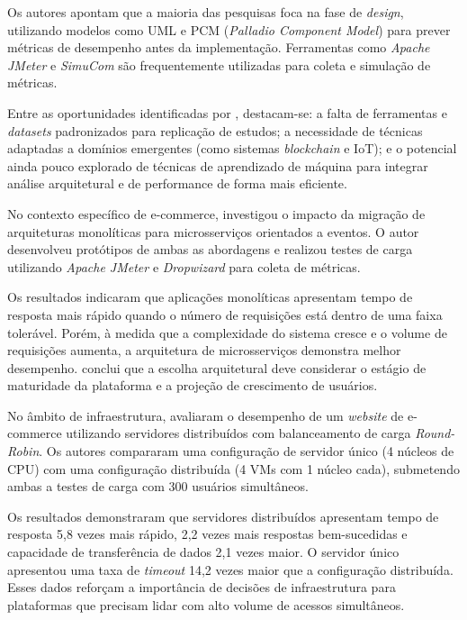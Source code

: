 Os autores apontam que a maioria das pesquisas foca na fase de \textit{design}, utilizando modelos como UML e PCM (\textit{Palladio Component Model}) para prever métricas de desempenho antes da implementação. Ferramentas como \textit{Apache JMeter} e \textit{SimuCom} são frequentemente utilizadas para coleta e simulação de métricas.

Entre as oportunidades identificadas por \cite{zhao_systematic_2024}, destacam-se: a falta de ferramentas e \textit{datasets} padronizados para replicação de estudos; a necessidade de técnicas adaptadas a domínios emergentes (como sistemas \textit{blockchain} e IoT); e o potencial ainda pouco explorado de técnicas de aprendizado de máquina para integrar análise arquitetural e de performance de forma mais eficiente.

No contexto específico de e-commerce, \cite{ubur_reviewing_2023} investigou o impacto da migração de arquiteturas monolíticas para microsserviços orientados a eventos. O autor desenvolveu protótipos de ambas as abordagens e realizou testes de carga utilizando \textit{Apache JMeter} e \textit{Dropwizard} para coleta de métricas.

Os resultados indicaram que aplicações monolíticas apresentam tempo de resposta mais rápido quando o número de requisições está dentro de uma faixa tolerável. Porém, à medida que a complexidade do sistema cresce e o volume de requisições aumenta, a arquitetura de microsserviços demonstra melhor desempenho. \cite{ubur_reviewing_2023} conclui que a escolha arquitetural deve considerar o estágio de maturidade da plataforma e a projeção de crescimento de usuários.

No âmbito de infraestrutura, \cite{satwika_performance_2024} avaliaram o desempenho de um \textit{website} de e-commerce utilizando servidores distribuídos com balanceamento de carga \textit{Round-Robin}. Os autores compararam uma configuração de servidor único (4 núcleos de CPU) com uma configuração distribuída (4 VMs com 1 núcleo cada), submetendo ambas a testes de carga com 300 usuários simultâneos.

Os resultados demonstraram que servidores distribuídos apresentam tempo de resposta 5,8 vezes mais rápido, 2,2 vezes mais respostas bem-sucedidas e capacidade de transferência de dados 2,1 vezes maior. O servidor único apresentou uma taxa de \textit{timeout} 14,2 vezes maior que a configuração distribuída. Esses dados reforçam a importância de decisões de infraestrutura para plataformas que precisam lidar com alto volume de acessos simultâneos.

